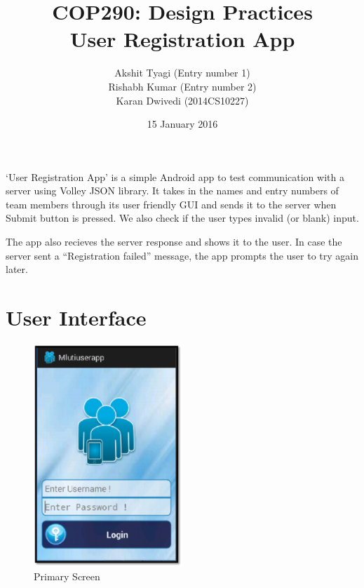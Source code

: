 \documentclass[12pt,a4paper,titlepage]{article}
\title{COP290: Design Practices\break\\User Registration App}
\author{Akshit Tyagi (Entry number 1) \\ Rishabh Kumar (Entry number 2) \\ Karan Dwivedi (2014CS10227) }
\date{15 January 2016}
\begin{document}
\maketitle

`User Registration App' is a simple Android app to test communication with a server using Volley JSON library. It takes in the names and entry numbers of team members through its user friendly GUI and sends it to the server when Submit button is pressed. We also check if the user types invalid (or blank) input.

The app also recieves the server response and shows it to the user. In case the server sent a ``Registration failed'' message, the app prompts the user to try again later.

\section{User Interface}

\begin{figure}[!ht]
	\centering
	\includegraphics[width=0.5\textwidth]{./UserInterface}
	\caption{Primary Screen}
\end{figure}
\end{document}
